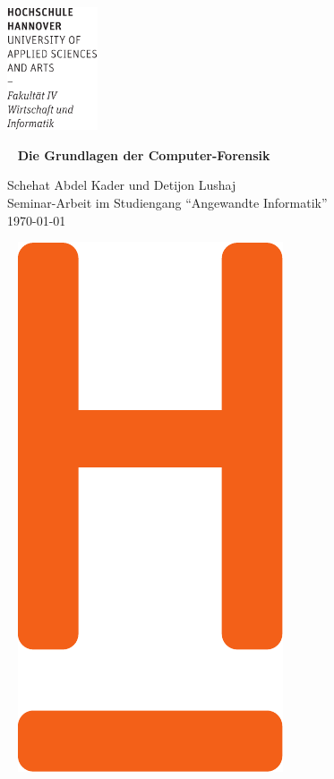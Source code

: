 \documentclass[12pt,DIV=14, version=first, BCOR=10mm,a4paper,twoside,parskip=half-,headsepline,headinclude]{scrartcl}
\begin{document}
\thispagestyle{empty} %
\includegraphics[width=0.2\textwidth]{hsh_logo/Wortmarke_WI_schwarz}

{~ \sffamily
    \vfill
    {\Huge\bfseries Die Grundlagen der Computer-Forensik}
    \bigskip

    {\Large 
    Schehat Abdel Kader und Detijon Lushaj \\[2ex]
    Seminar-Arbeit im Studiengang "`Angewandte Informatik"'
    \\[5ex]
    \today } 
}
\vfill
~ \hfill
\includegraphics[height=0.3\paperheight]{hsh_logo/H_WI_Pantone1665} 

\vspace*{-3cm}

\newpage \thispagestyle{empty}
\end{document}
